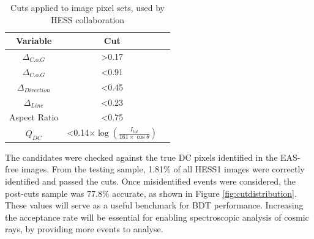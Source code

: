 \documentclass[11pt]{article}
\begin{document}
\begin{table}[h!]
  \centering
  \caption{Cuts applied to image pixel sets, used by HESS collaboration \cite{hess07}}
  \label{tab:table1}
  \begin{tabular}{ccc}
    \toprule
    Variable & Cut\\
    \midrule
     $ \Delta_{C.o.G}$ & \textgreater 0.17 \\
     $ \Delta_{C.o.G}$ & \textless 0.91 \\
     $\Delta_{Direction}$ & \textless 0.45 \\
     $\Delta_{Line}$ & \textless 0.23 \\
     Aspect Ratio & \textless 0.75 \\
     $Q_{DC}$ & \textless 0.14$ \times \log(\frac{I_{tot}}{161 \times \cos \theta})$ \\
    \bottomrule
  \end{tabular}
\end{table}

The candidates were checked against the true DC pixels identified in the EAS-free images. From the testing sample, 1.81\% of all HESS1 images were correctly identified and passed the cuts. Once misidentified events were considered, the post-cuts sample was 77.8\% accurate, as shown in Figure \ref{fig:cutdistribution}. These values will serve as a useful benchmark for BDT performance. Increasing the acceptance rate will be essential for enabling spectroscopic analysis of cosmic rays, by providing more events to analyse.
\end{document}
